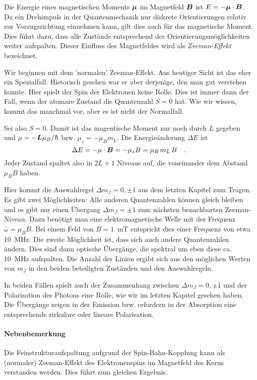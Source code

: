 Die Energie eines magnetischen Moments $\boldsymbol{\mu}$ im Magnetfeld $\boldsymbol{B}$ ist $E = - \boldsymbol{\mu} \cdot \boldsymbol{B}$. Da ein Drehimpuls in der Quantenmechanik nur diskrete Orientierungen relativ zur Vorzugsrichtung einnehmen kann, gilt dies auch für das magnetische Moment. Dies führt dazu, dass alle Zustände entsprechend der Orientierungsmöglichkeiten weiter aufspalten. Dieser Einfluss des Magnetfeldes wird als \emph{Zeeman-Effekt} bezeichnet. 

Wir beginnen mit dem 'normalen' Zeeman-Effekt. Aus heutiger Sicht ist das eher ein Spezialfall. Historisch gesehen war er aber derjenige, den man gut verstehen konnte. Hier spielt der Spin der Elektronen keine Rolle. Dies ist immer dann der Fall, wenn der atomare Zustand die Quantenzahl $S=0$ hat. Wie wir wissen, kommt das manchmal vor, aber es ist nicht der Normalfall.

Sei also $S=0$. Damit ist das magentische Moment nur noch durch $L$ gegeben und $\mu = - \boldsymbol{L} \mu_B / \hbar$ bzw. $\mu_z = - \mu_B  m_L$. Die Energieänderung $\Delta E$ ist
\begin{equation}
    \Delta E = - \mu \cdot \boldsymbol{B} =- \mu_z B =  \mu_B \, m_L \, B  \quad .
\end{equation}
Jeder Zustand spaltet also in $2L + 1$ Niveaus auf, die voneinander dem Abstand $\mu_B B$ haben.

Hier kommt die Auswahlregel $\Delta m_J = 0, \pm1$ aus dem letzten Kapitel zum Tragen. Es gibt zwei Möglichkeiten: Alle anderen Quantenzahlen können gleich bleiben und es gibt nur einen Übergang $\Delta m_J = \pm1$ zum nächsten benachbarten Zeeman-Niveau. Dazu benötigt man eine elektromagnetische Welle mit der Frequenz $\bar \omega = \mu_B B$. Bei einem Feld von $B=1$~mT entspricht dies einer Frequenz von etwa 10~MHz. Die zweite Möglichkeit ist, dass sich auch andere Quantenzahlen ändern. Dies sind dann optische Übergänge, die spektral um eben diese ca. 10~MHz aufspalten. Die Anzahl der Linien ergibt sich aus den möglichen Werten von $m_J$ in den beiden beteiligten Zuständen und den Auswahlregeln.


In beiden Fällen spielt auch der Zusammenhang zwischen $\Delta m_J = 0, \pm1$ und der Polarisation des Photons eine Rolle, wie wir im letzten Kapitel gesehen haben. Die Übergänge zeigen in der Emission bzw. erfordern in der Absorption eine entsprechende zirkulare oder lineare Polarisation.


\paragraph{Nebenbemerkung} Die Feinstrukturaufspaltung aufgrund der Spin-Bahn-Kopplung kann als (normaler) Zeeman-Effekt des Elektronenspins im Magnetfeld des Kerns verstanden werden. Dies führt zum gleichen Ergebnis.


